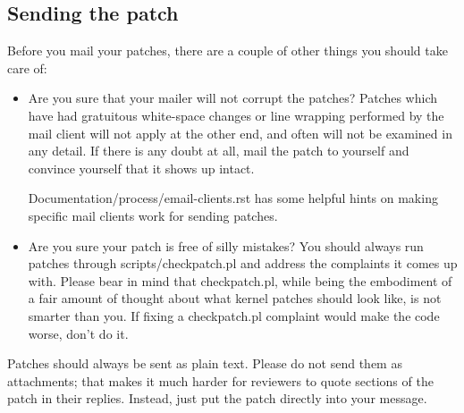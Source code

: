 \documentclass[a4paper,8pt,english]{sphinxmanual}
\begin{document}
\subsection{Sending the patch}
\label{process/5.Posting:sending-the-patch}
Before you mail your patches, there are a couple of other things you should
take care of:
\begin{itemize}
\item {} 
Are you sure that your mailer will not corrupt the patches?  Patches
which have had gratuitous white-space changes or line wrapping performed
by the mail client will not apply at the other end, and often will not
be examined in any detail.  If there is any doubt at all, mail the patch
to yourself and convince yourself that it shows up intact.

Documentation/process/email-clients.rst has some helpful hints on making
specific mail clients work for sending patches.

\item {} 
Are you sure your patch is free of silly mistakes?  You should always
run patches through scripts/checkpatch.pl and address the complaints it
comes up with.  Please bear in mind that checkpatch.pl, while being the
embodiment of a fair amount of thought about what kernel patches should
look like, is not smarter than you.  If fixing a checkpatch.pl complaint
would make the code worse, don't do it.

\end{itemize}

Patches should always be sent as plain text.  Please do not send them as
attachments; that makes it much harder for reviewers to quote sections of
the patch in their replies.  Instead, just put the patch directly into your
message.
\end{document}
